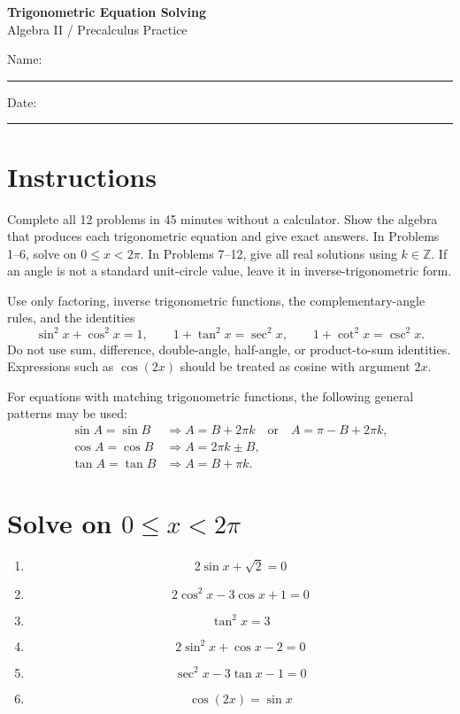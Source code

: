 \documentclass[12pt]{article}
\begin{document}
\begin{center}
  {\Large\textbf{Trigonometric Equation Solving}}\\[3pt]
  {\large Algebra II / Precalculus Practice}
\end{center}

\noindent Name: \rule{2.7in}{0.4pt}\hfill Date: \rule{1.5in}{0.4pt}

\section*{Instructions}
Complete all 12 problems in 45 minutes without a calculator. Show the algebra that produces each trigonometric equation and give exact answers. In Problems 1--6, solve on $0\le x<2\pi$. In Problems 7--12, give all real solutions using $k\in\mathbb Z$. If an angle is not a standard unit-circle value, leave it in inverse-trigonometric form.

Use only factoring, inverse trigonometric functions, the complementary-angle rules, and the identities
\[
\sin^2x+\cos^2x=1,
\qquad
1+\tan^2x=\sec^2x,
\qquad
1+\cot^2x=\csc^2x.
\]
Do not use sum, difference, double-angle, half-angle, or product-to-sum identities. Expressions such as $\cos(2x)$ should be treated as cosine with argument $2x$.

For equations with matching trigonometric functions, the following general patterns may be used:
\[
\begin{aligned}
\sin A=\sin B
&\Longrightarrow A=B+2\pi k
\quad\text{or}\quad
A=\pi-B+2\pi k,\\
\cos A=\cos B
&\Longrightarrow A=2\pi k\pm B,\\
\tan A=\tan B
&\Longrightarrow A=B+\pi k.
\end{aligned}
\]

\section*{Solve on $0\le x<2\pi$}
\begin{enumerate}[leftmargin=*,itemsep=1.35em]
  \item
  \[
    2\sin x+\sqrt2=0
  \]

  \item
  \[
    2\cos^2x-3\cos x+1=0
  \]

  \item
  \[
    \tan^2x=3
  \]

  \item
  \[
    2\sin^2x+\cos x-2=0
  \]

  \item
  \[
    \sec^2x-3\tan x-1=0
  \]

  \item
  \[
    \cos(2x)=\sin x
  \]
\end{enumerate}
\end{document}
